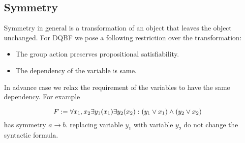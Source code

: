 \documentclass[conference]{IEEEtran}
\begin{document}
\subsection{Symmetry}
\label{sec:sym}

Symmetry in general is a transformation of an object that leaves the object unchanged.
%
% 
%
%
%
%
For DQBF we pose a following restriction over the transformation:
\begin{itemize}
   \item The group action preserves propositional satisfiability.
   \item The dependency of the variable is same. 
\end{itemize}

In advance case we relax the requirement of the variables to have the same dependency. For example \par\noindent
%
\begin{equation}
F := \forall x_1,x_2 \exists y_1(x_1) \exists y_2(x_2): (y_1 \lor x_1) \land (y_2 \lor  x_2)
\label{eqn:exs}
\end{equation}
has symmetry $a \to b$. replacing variable $y_1$ with variable $y_2$ do not change the syntactic formula.
\end{document}
